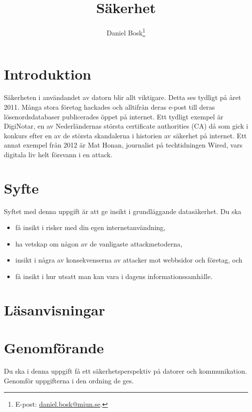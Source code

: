 \documentclass[11pt,a4paper]{miunasgn}
\title{Säkerhet}
\author{Daniel Bosk\footnote{%
	E-post: \href{mailto:daniel.bosk@miun.se}{daniel.bosk@miun.se}.
}}
\date{\svnId}
\begin{document}
\maketitle
\thispagestyle{foot}
\tableofcontents


\section{Introduktion}
\label{sec:Introduktion}
\noindent
Säkerheten i användandet av datorn blir allt viktigare.
Detta ses tydligt på året 2011.
Många stora företag hackades och alltifrån deras e-post till deras 
lösenordsdatabaser publicerades öppet på internet.
Ett tydligt exempel är DigiNotar, en av Nederländernas största certificate 
authorities (CA) då som gick i konkurs efter en av de största skandalerna 
i historien av säkerhet på internet.
Ett annat exempel från 2012 är Mat Honan, journalist på techtidningen Wired, 
vars digitala liv helt försvann i en attack.


\section{Syfte}
\label{sec:Syfte}
\noindent
Syftet med denna uppgift är att ge insikt i grundläggande datasäkerhet.
Du ska
\begin{itemize}
	\item få insikt i risker med din egen internetanvändning,
	\item ha vetskap om någon av de vanligaste attackmetoderna,
	\item insikt i några av konsekvenserna av attacker mot webbsidor och
		företag, och
	\item få insikt i hur utsatt man kan vara i dagens informationssamhälle.
\end{itemize}


\section{Läsanvisningar}
\label{sec:Lasanvisningar}
\noindent



\section{Genomförande}
\label{sec:Genomforande}
\noindent
Du ska i denna uppgift få ett säkerhetsperspektiv på datorer och kommunikation.
Genomför uppgifterna i den ordning de ges.
\end{document}
